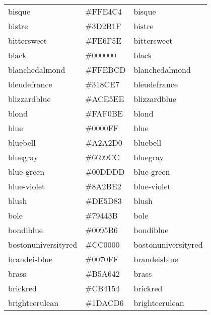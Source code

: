 \documentclass[
]{article}
\begin{document}
\begin{longtable}[]{@{}lll@{}}
bisque & \colorbox[rgb]{1.0,0.89,0.77}{\#FFE4C4} &
\textcolor[rgb]{1.0,0.89,0.77}{bisque                }\tabularnewline
bistre & \colorbox[rgb]{0.24,0.17,0.12}{\#3D2B1F} &
\textcolor[rgb]{0.24,0.17,0.12}{bistre                }\tabularnewline
bittersweet & \colorbox[rgb]{1.0,0.44,0.37}{\#FE6F5E} &
\textcolor[rgb]{1.0,0.44,0.37}{bittersweet           }\tabularnewline
black & \colorbox[rgb]{0.0,0.0,0.0}{\#000000} &
\textcolor[rgb]{0.0,0.0,0.0}{black                 }\tabularnewline
blanchedalmond & \colorbox[rgb]{1.0,0.92,0.8}{\#FFEBCD} &
\textcolor[rgb]{1.0,0.92,0.8}{blanchedalmond        }\tabularnewline
bleudefrance & \colorbox[rgb]{0.19,0.55,0.91}{\#318CE7} &
\textcolor[rgb]{0.19,0.55,0.91}{bleudefrance          }\tabularnewline
blizzardblue & \colorbox[rgb]{0.67,0.9,0.93}{\#ACE5EE} &
\textcolor[rgb]{0.67,0.9,0.93}{blizzardblue          }\tabularnewline
blond & \colorbox[rgb]{0.98,0.94,0.75}{\#FAF0BE} &
\textcolor[rgb]{0.98,0.94,0.75}{blond                 }\tabularnewline
blue & \colorbox[rgb]{0.0,0.0,1.0}{\#0000FF} &
\textcolor[rgb]{0.0,0.0,1.0}{blue                  }\tabularnewline
bluebell & \colorbox[rgb]{0.64,0.64,0.82}{\#A2A2D0} &
\textcolor[rgb]{0.64,0.64,0.82}{bluebell              }\tabularnewline
bluegray & \colorbox[rgb]{0.4,0.6,0.8}{\#6699CC} &
\textcolor[rgb]{0.4,0.6,0.8}{bluegray              }\tabularnewline
blue-green & \colorbox[rgb]{0.0,0.87,0.87}{\#00DDDD} &
\textcolor[rgb]{0.0,0.87,0.87}{blue-green            }\tabularnewline
blue-violet & \colorbox[rgb]{0.54,0.17,0.89}{\#8A2BE2} &
\textcolor[rgb]{0.54,0.17,0.89}{blue-violet           }\tabularnewline
blush & \colorbox[rgb]{0.87,0.36,0.51}{\#DE5D83} &
\textcolor[rgb]{0.87,0.36,0.51}{blush                 }\tabularnewline
bole & \colorbox[rgb]{0.47,0.27,0.23}{\#79443B} &
\textcolor[rgb]{0.47,0.27,0.23}{bole                  }\tabularnewline
bondiblue & \colorbox[rgb]{0.0,0.58,0.71}{\#0095B6} &
\textcolor[rgb]{0.0,0.58,0.71}{bondiblue             }\tabularnewline
bostonuniversityred & \colorbox[rgb]{0.8,0.0,0.0}{\#CC0000} &
\textcolor[rgb]{0.8,0.0,0.0}{bostonuniversityred   }\tabularnewline
brandeisblue & \colorbox[rgb]{0.0,0.44,1.0}{\#0070FF} &
\textcolor[rgb]{0.0,0.44,1.0}{brandeisblue          }\tabularnewline
brass & \colorbox[rgb]{0.71,0.65,0.26}{\#B5A642} &
\textcolor[rgb]{0.71,0.65,0.26}{brass                 }\tabularnewline
brickred & \colorbox[rgb]{0.8,0.25,0.33}{\#CB4154} &
\textcolor[rgb]{0.8,0.25,0.33}{brickred              }\tabularnewline
brightcerulean & \colorbox[rgb]{0.11,0.67,0.84}{\#1DACD6} &
\textcolor[rgb]{0.11,0.67,0.84}{brightcerulean        }\tabularnewline

\end{longtable}
\end{document}
